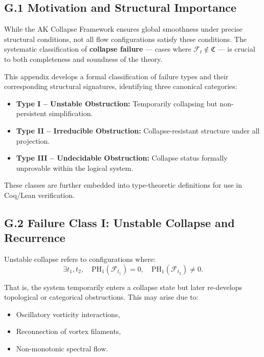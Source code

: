 \documentclass[11pt]{article}
\begin{document}
\subsection{G.1 Motivation and Structural Importance}

While the AK Collapse Framework ensures global smoothness under precise structural conditions, not all flow configurations satisfy these conditions. The systematic classification of \textbf{collapse failure} --- cases where $\mathcal{F}_t \notin \mathfrak{C}$ --- is crucial to both completeness and soundness of the theory.

This appendix develops a formal classification of failure types and their corresponding structural signatures, identifying three canonical categories:

\begin{itemize}
  \item \textbf{Type I – Unstable Obstruction:} Temporarily collapsing but non-persistent simplification.
  \item \textbf{Type II – Irreducible Obstruction:} Collapse-resistant structure under all projection.
  \item \textbf{Type III – Undecidable Obstruction:} Collapse status formally unprovable within the logical system.
\end{itemize}

These classes are further embedded into type-theoretic definitions for use in Coq/Lean verification.

\subsection{G.2 Failure Class I: Unstable Collapse and Recurrence}

Unstable collapse refers to configurations where:
\[
\exists t_1, t_2,\quad \mathrm{PH}_1(\mathcal{F}_{t_1}) = 0, \quad \mathrm{PH}_1(\mathcal{F}_{t_2}) \neq 0.
\]

That is, the system temporarily enters a collapse state but later re-develops topological or categorical obstructions. This may arise due to:

\begin{itemize}
  \item Oscillatory vorticity interactions,
  \item Reconnection of vortex filaments,
  \item Non-monotonic spectral flow.
\end{itemize}
\end{document}
